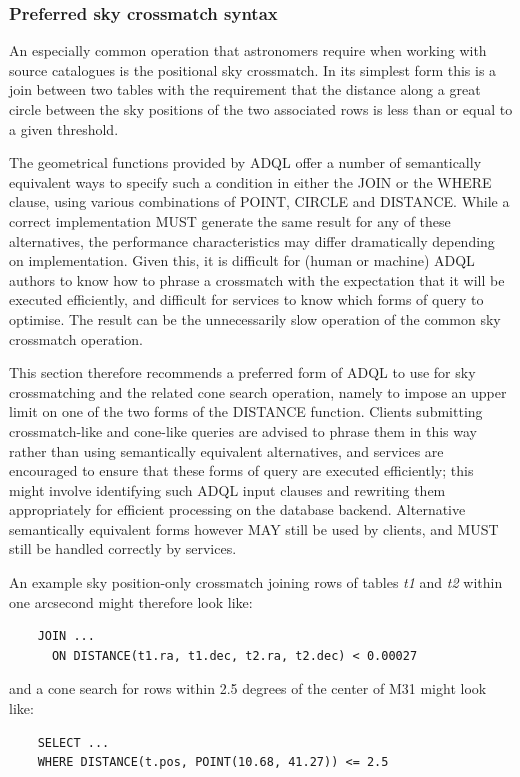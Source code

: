 \documentclass[11pt,a4paper]{ivoa}
\begin{document}

\subsubsection{Preferred sky crossmatch syntax}
\label{sec:functions.geom.crossmatch}

An especially common operation that astronomers require when working
with source catalogues is the positional sky crossmatch.
In its simplest form this is a join between two tables with the
requirement that the distance along a great circle between the
sky positions of the two associated rows is less than or equal to
a given threshold.

The geometrical functions provided by ADQL offer a number of
semantically equivalent ways to specify such a condition
in either the JOIN or the WHERE clause, using various
combinations of POINT, CIRCLE and DISTANCE.
While a correct implementation MUST generate the same result for
any of these alternatives, the performance characteristics may
differ dramatically depending on implementation.
Given this, it is difficult for (human or machine) ADQL authors
to know how to phrase a crossmatch with the expectation that it
will be executed efficiently, and difficult for services to know
which forms of query to optimise.  The result can be the
unnecessarily slow operation of the common sky crossmatch operation.

This section therefore recommends a preferred form of ADQL
to use for sky crossmatching and the related cone search operation,
namely to impose an upper limit on one of the two forms of the
DISTANCE function.
Clients submitting crossmatch-like and cone-like
queries are advised to phrase them in this way rather than using semantically
equivalent alternatives, and services are encouraged to ensure that
these forms of query are executed efficiently; this might involve
identifying such ADQL input clauses and rewriting them appropriately
for efficient processing on the database backend.
Alternative semantically equivalent forms however MAY still be
used by clients, and MUST still be handled correctly by services.

An example sky position-only crossmatch joining rows of tables
\textit{t1} and \textit{t2} within one arcsecond might therefore look like:
\begin{verbatim}
    JOIN ...
      ON DISTANCE(t1.ra, t1.dec, t2.ra, t2.dec) < 0.00027
\end{verbatim}
and a cone search for rows within 2.5 degrees of
the center of M31 might look like:
\begin{verbatim}
    SELECT ...
    WHERE DISTANCE(t.pos, POINT(10.68, 41.27)) <= 2.5
\end{verbatim}
\end{document}
